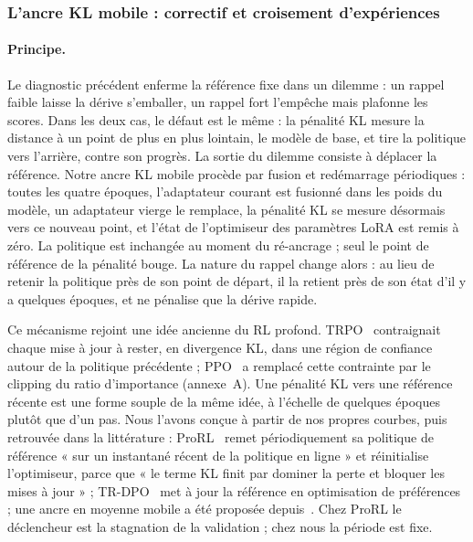 \documentclass[11pt,a4paper]{article}
\begin{document}
\subsubsection{L'ancre KL mobile : correctif et croisement d'expériences}

\paragraph{Principe.} Le diagnostic précédent enferme la référence fixe dans un dilemme : un rappel faible laisse la dérive s'emballer, un rappel fort l'empêche mais plafonne les scores. Dans les deux cas, le défaut est le même : la pénalité KL mesure la distance à un point de plus en plus lointain, le modèle de base, et tire la politique vers l'arrière, contre son progrès. La sortie du dilemme consiste à déplacer la référence. Notre ancre KL mobile procède par fusion et redémarrage périodiques : toutes les quatre époques, l'adaptateur courant est fusionné dans les poids du modèle, un adaptateur vierge le remplace, la pénalité KL se mesure désormais vers ce nouveau point, et l'état de l'optimiseur des paramètres LoRA est remis à zéro. La politique est inchangée au moment du ré-ancrage ; seul le point de référence de la pénalité bouge. La nature du rappel change alors : au lieu de retenir la politique près de son point de départ, il la retient près de son état d'il y a quelques époques, et ne pénalise que la dérive rapide.

Ce mécanisme rejoint une idée ancienne du RL profond. TRPO~\cite{schulman2015trpo} contraignait chaque mise à jour à rester, en divergence KL, dans une région de confiance autour de la politique précédente ; PPO~\cite{schulman2017proximal} a remplacé cette contrainte par le clipping du ratio d'importance (annexe~A). Une pénalité KL vers une référence récente est une forme souple de la même idée, à l'échelle de quelques époques plutôt que d'un pas. Nous l'avons conçue à partir de nos propres courbes, puis retrouvée dans la littérature : ProRL~\cite{liu2025prorl} remet périodiquement sa politique de référence « sur un instantané récent de la politique en ligne » et réinitialise l'optimiseur, parce que « le terme KL finit par dominer la perte et bloquer les mises à jour » ; TR-DPO~\cite{gorbatovski2024trdpo} met à jour la référence en optimisation de préférences ; une ancre en moyenne mobile a été proposée depuis~\cite{zhang2026emapg}. Chez ProRL le déclencheur est la stagnation de la validation ; chez nous la période est fixe.
\end{document}
